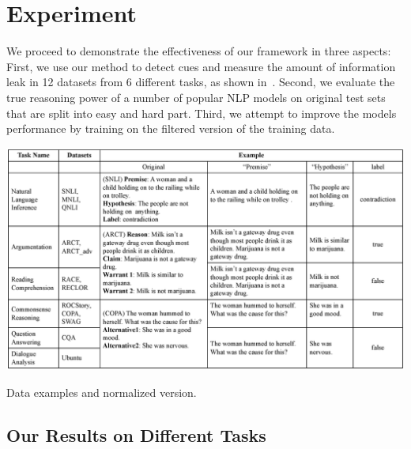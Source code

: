 \section{Experiment}
\label{sec:experiment}

We proceed to demonstrate the effectiveness of our framework in three aspects:
First, we use our method to detect cues and measure the amount of information leak
in 12 datasets from 6 different tasks, as shown in~. 
Second, we evaluate the true reasoning power of a number of popular NLP
models on original test sets that are split into 
easy and hard part. 
Third, we attempt to improve the models performance by training on the filtered
version of the training data.
 

\begin{table}[th]
\centering
\includegraphics[width=2\columnwidth]{picture/datasets_exp.eps}
\caption{Data examples and normalized version.}
\label{tab:datasets_exp}
\end{table}

 \subsection{Our Results on Different Tasks}
 \label{sec:experiment1}
 
